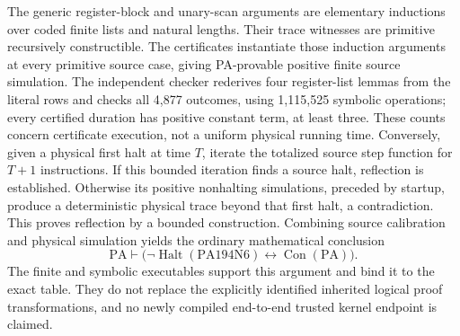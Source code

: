The generic register-block and unary-scan arguments are elementary
inductions over coded finite lists and natural lengths. Their trace
witnesses are primitive recursively constructible. The certificates instantiate those induction arguments at every
primitive source case, giving PA-provable positive finite source simulation.
The independent checker rederives four register-list lemmas from the
literal rows and checks all 4,877 outcomes, using 1,115,525 symbolic
operations; every certified duration has positive constant term, at least
three. These counts concern certificate execution, not a uniform physical
running time. Conversely, given a physical first halt at time $T$, iterate the totalized
source step function for $T+1$ instructions. If this bounded iteration
finds a source halt, reflection is established. Otherwise its positive
nonhalting simulations, preceded by startup, produce a deterministic
physical trace beyond that first halt, a contradiction. This proves
reflection by a bounded construction.
Combining source calibration and physical simulation yields the ordinary
mathematical conclusion
\[
 \mathrm{PA}\vdash
 \bigl(\neg\operatorname{Halt}(\mathrm{PA194N6})
                 \leftrightarrow\operatorname{Con}(\mathrm{PA})\bigr).
\]
The finite and symbolic executables support this argument and bind it to
the exact table. They do not replace the explicitly identified inherited
logical proof transformations, and no newly compiled end-to-end trusted
kernel endpoint is claimed.

